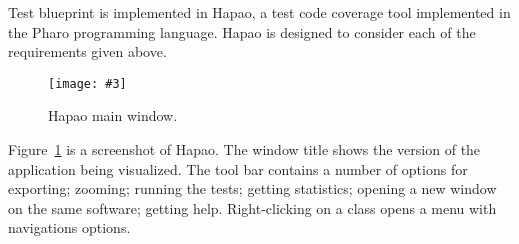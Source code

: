 \documentclass{sig-alternate}
\newcommand{\fig}[4]{
	\begin{figure}[#1]
		\centering
		\texttt{[image: \#3]}
		\caption{\label{fig:#3}#4}
	\end{figure}}
\newcommand{\seclabel}[1]{\label{sec:#1}}
\newcommand{\figref}[1]{Figure~\ref{fig:#1}}
\newcommand{\hapao}{Hapao\xspace}
\begin{document}
Test blueprint is implemented in Hapao, a test code coverage tool implemented in the Pharo programming language. \hapao is designed to consider each of the requirements given above. 

\fig{}{0.37}{Hapao.png}{Hapao main window.}

\figref{Hapao.png} is a screenshot of Hapao. The window title shows the version of the application being visualized. The tool bar contains a number of options for exporting; zooming; running the tests; getting statistics; opening a new window on the same software; getting help. Right-clicking on a class opens a menu with navigations options.



%




%
\end{document}
